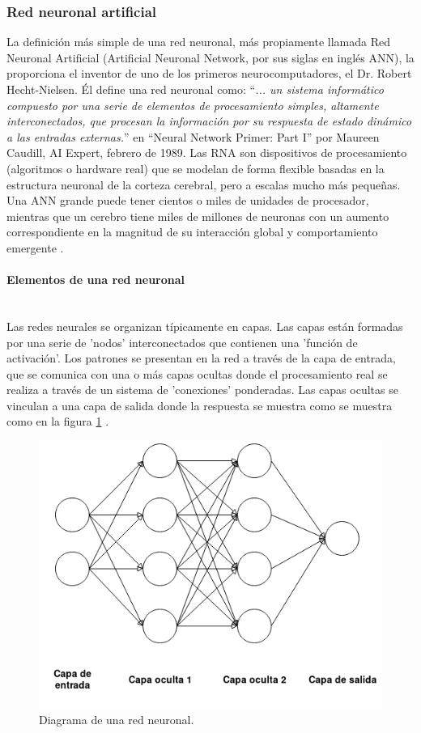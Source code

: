 \subsubsection{Red neuronal artificial}

La definición más simple de una red neuronal, más propiamente llamada Red Neuronal Artificial (Artificial Neuronal Network, por sus siglas en inglés ANN), la proporciona el inventor de uno de los primeros neurocomputadores, el Dr. Robert Hecht-Nielsen. Él define una red neuronal como: ``\textit{... un sistema informático compuesto por una serie de elementos de procesamiento simples, altamente interconectados, que procesan la información por su respuesta de estado dinámico a las entradas externas.}'' en ``Neural Network Primer: Part I'' por Maureen Caudill, AI Expert, febrero de 1989. Las RNA son dispositivos de procesamiento (algoritmos o hardware real) que se modelan de forma flexible basadas en la estructura neuronal de la corteza cerebral, pero a escalas mucho más pequeñas. Una ANN grande puede tener cientos o miles de unidades de procesador, mientras que un cerebro tiene miles de millones de neuronas con un aumento correspondiente en la magnitud de su interacción global y comportamiento emergente \cite{A Basic Introduction To Neural Networks}. \\

\paragraph{Elementos de una red neuronal} ~\\
 
Las redes neurales se organizan típicamente en capas. Las capas están formadas por una serie de 'nodos' interconectados que contienen una 'función de activación'. Los patrones se presentan en la red a través de la capa de entrada, que se comunica con una o más capas ocultas donde el procesamiento real se realiza a través de un sistema de 'conexiones' ponderadas. Las capas ocultas se vinculan a una capa de salida donde la respuesta se muestra como se muestra como en la figura \ref{image:redneuronaldiagrama} \cite{A Basic Introduction To Neural Networks}.

\FloatBarrier
\begin{figure}[htbp!]
		\centering
			\includegraphics[width=.45 \textwidth]{imagenes/red_neuronal}
		\caption{Diagrama de una red neuronal.}
		\label{image:redneuronaldiagrama}
\end{figure}


